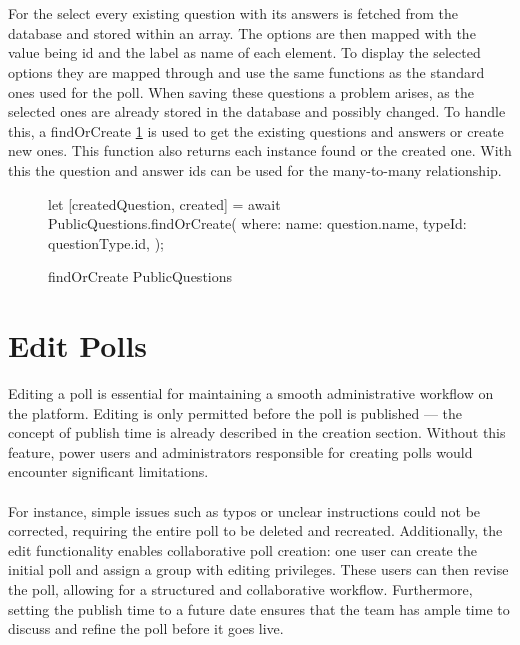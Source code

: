 \documentclass[a4paper,12pt]{report}
\begin{document}
\\ \\
For the select every existing question with its answers is fetched from the database and stored within an array. The options are then mapped with the value being id and the label as name of each element. To display the selected options they are mapped through and use the same functions as the standard ones used for the poll. When saving these questions a problem arises, as the selected ones are already stored in the database and possibly changed. To handle this, a findOrCreate \ref{fig:publicQuestions} is used to get the existing questions and answers or create new ones. This function also returns each instance found or the created one. With this the question and answer ids can be used for the many-to-many relationship. \parencite{sequelizedoku} 
\begin{figure}[h!]
\begin{code}
let [createdQuestion, created] = await PublicQuestions.findOrCreate({
	where: {
		name: question.name,
		typeId: questionType.id,
	}
});
\end{code}
	\caption{findOrCreate PublicQuestions}
	\label{fig:publicQuestions}
\end{figure}

\section{Edit Polls}
Editing a poll is essential for maintaining a smooth administrative workflow on the platform. Editing is only permitted before the poll is published — the concept of publish time is already described in the creation section. Without this feature, power users and administrators responsible for creating polls would encounter significant limitations. \\ \\
For instance, simple issues such as typos or unclear instructions could not be corrected, requiring the entire poll to be deleted and recreated. Additionally, the edit functionality enables collaborative poll creation: one user can create the initial poll and assign a group with editing privileges. These users can then revise the poll, allowing for a structured and collaborative workflow. Furthermore, setting the publish time to a future date ensures that the team has ample time to discuss and refine the poll before it goes live.
\end{document}
